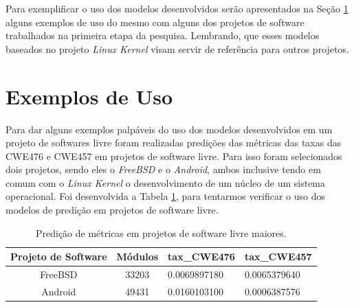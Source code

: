 Para exemplificar o uso dos modelos desenvolvidos serão apresentados na Seção
\ref{exemplosdeuso} alguns exemplos de uso do mesmo com alguns dos projetos de
software trabalhados na primeira etapa da pesquisa. Lembrando, que esses modelos
baseados no projeto \textit{Linux Kernel} visam servir de referência para outros
projetos.




\section{Exemplos de Uso}\label{exemplosdeuso}

Para dar alguns exemplos palpáveis do uso dos modelos desenvolvidos em um
projeto de softwares livre foram realizadas predições das métricas das taxas das
CWE476 e CWE457 em projetos de software livre. Para isso foram selecionados dois
projetos, sendo eles o \textit{FreeBSD} e o \textit{Android}, ambos inclusive
tendo em comum com o \textit{Linux Kernel} o desenvolvimento de um núcleo de um
sistema operacional.  Foi desenvolvida a Tabela \ref{tab:exemplos2}, para
tentarmos verificar o uso dos modelos de predição em projetos de software livre.

\begin{table}[h]
 \centering
 \begin{tabular}{ccll}
  \hline
  \rowcolor[HTML]{EFEFEF} 
  Projeto de Software & Módulos &
  \multicolumn{1}{c}{\cellcolor[HTML]{EFEFEF}tax\_CWE476} &
  \multicolumn{1}{c}{\cellcolor[HTML]{EFEFEF}tax\_CWE457} \\ \hline
  FreeBSD             & 33203   & 0.0069897180
  & 0.0065379640                                           \\ \hline
  Android             & 49431   & 0.0160103100
  & 0.0006387576                                          \\ \hline
 \end{tabular}
 \caption{Predição de métricas em projetos de software livre maiores.}
 \label{tab:exemplos2}
\end{table}

